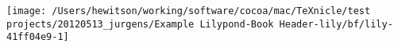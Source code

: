 \texttt{[image: /Users/hewitson/working/software/cocoa/mac/TeXnicle/test projects/20120513\_jurgens/Example Lilypond-Book Header-lily/bf/lily-41ff04e9-1]}%
